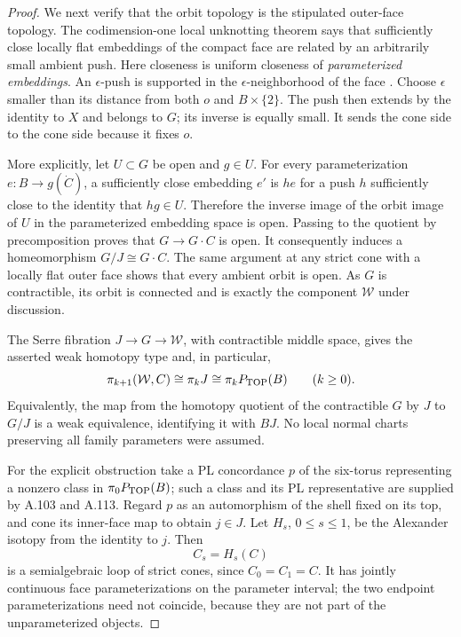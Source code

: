 \begin{proof}
We next verify that the orbit topology is the stipulated outer-face
topology. The codimension-one local unknotting theorem
\cite[Theorem~7.3.1, p.~358]{DavermanVenema2009} says that sufficiently
close locally flat embeddings of the compact face are related by an
arbitrarily small ambient push. Here closeness is uniform closeness of
\emph{parameterized embeddings}. An $\epsilon$-push is supported in
the $\epsilon$-neighborhood of the face
\cite[p.~115]{DavermanVenema2009}. Choose $\epsilon$ smaller than its
distance from both $o$ and $B\times\{2\}$. The push then extends by the
identity to $X$ and belongs to $G$; its inverse is equally small. It
sends the cone side to the cone side because it fixes $o$.

More explicitly, let $U\subset G$ be open and $g\in U$. For every
parameterization $e:B\to g(\dot C)$, a sufficiently close embedding
$e'$ is $he$ for a push $h$ sufficiently close to the identity that
$hg\in U$. Therefore the inverse image of the orbit image of $U$ in
the parameterized embedding space is open. Passing to the quotient by
precomposition proves that $G\to G\cdot C$ is open. It consequently
induces a homeomorphism $G/J\cong G\cdot C$. The same argument at any
strict cone with a locally flat outer face shows that every ambient
orbit is open. As $G$ is contractible, its orbit is connected and is
exactly the component $\mathcal W$ under discussion.

The Serre fibration $J\to G\to\mathcal W$, with contractible middle
space, gives the asserted weak homotopy type and, in particular,
\[
 \pi_{k+1}(\mathcal W,C)\cong\pi_kJ
          \cong\pi_kP_{\rm TOP}(B)\qquad(k\geq0).
\]
Equivalently, the map from the homotopy quotient of the contractible
$G$ by $J$ to $G/J$ is a weak equivalence, identifying it with $BJ$.
No local normal charts preserving all family parameters were assumed.

For the explicit obstruction take a PL concordance $p$ of the six-torus
representing a nonzero class in $\pi_0P_{\rm TOP}(B)$; such a class and
its PL representative are supplied by A.103 and A.113. Regard $p$ as
an automorphism of the shell fixed on its top, and cone its inner-face
map to obtain $j\in J$. Let $H_s$, $0\leq s\leq1$, be the Alexander
isotopy from the identity to $j$. Then
\[
                  C_s=H_s(C)
\]
is a semialgebraic loop of strict cones, since $C_0=C_1=C$.
It has jointly continuous face parameterizations on the parameter
interval; the two endpoint parameterizations need not coincide,
because they are not part of the unparameterized objects.


\end{proof}

